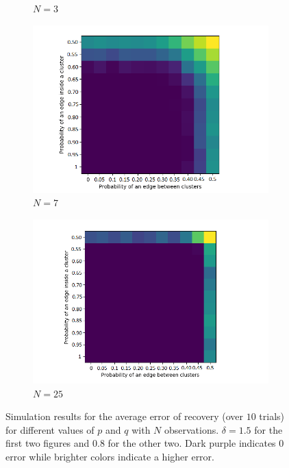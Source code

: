 \documentclass[12pt]{amsart}
\theoremstyle{remark}
\begin{document}
\begin{figure}
\begin{subfigure}[b]{0.5\textwidth}
         \caption{$N=3$}
     \end{subfigure}
     \hfill
     \begin{subfigure}[b]{0.5\textwidth}
         \centering
         \includegraphics[width=\textwidth]{./Pictures/Variapq7.PNG}
         \caption{$N = 7$}
     \end{subfigure}
     \hfill
     \begin{subfigure}[b]{0.5\textwidth}
         \centering
         \includegraphics[width=\textwidth]{./Pictures/Variapq25.PNG}
         \caption{$N = 25$}
     \end{subfigure}
        \caption{Simulation results for the average error of recovery (over $10$ trials) for different values of $p$ and $q$ with $N$ observations. $\delta = 1.5$ for the first two figures and $0.8$ for the other two. Dark purple indicates 0 error while brighter colors indicate a higher error.}
        \label{fig:Variapq}
\end{figure}
\end{document}
